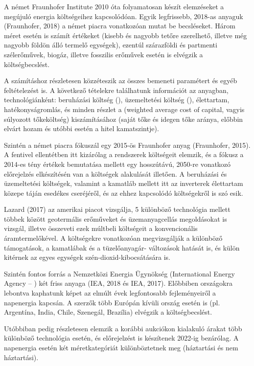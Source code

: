 \documentclass[twoside, magyar, showtrims]{corvinusphd}
\theoremstyle{plain}
\theoremstyle{remark}
\theoremstyle{definition}
\begin{document}
A német Fraunhofer Institute 2010 óta folyamatosan
készít elemzéseket a megújuló energia költségeihez kapcsolódóan.
Egyik legfrissebb, 2018-as anyaguk (Fraunhofer, 2018)
a német piacra vonatkozóan mutat be becsléseket.
Három  méret esetén is számít 
értékeket (kisebb és nagyobb tetőre szerelhető,
illetve még nagyobb földön álló termelő egységek), 
ezentúl szárazföldi és partmenti szélerőművek, biogáz,
illetve fosszilis erőművek esetén is elvégzik a költségbecslést.

A számításhoz részletesen közzéteszik
az összes bemeneti paramétert és egyéb feltételezést is.
A következő tételekre találhatunk információt
az anyagban, technológiánként: beruházási költség
(), üzemeltetési költség (), 
élettartam, hatékonyságromlás, és minden részlet a 
(weighted average cost of capital, vagyis súlyozott tőkeköltség)
kiszámításához (saját tőke és idegen tőke aránya, 
előbbin elvárt hozam és utóbbi esetén a hitel kamatszintje). 

Szintén a német piacra fókuszál egy 2015-ös
Fraunhofer anyag (Fraunhofer, 2015).
A fentivel ellentétben itt kizárólag a  
rendszerek költségeit elemzik, és a fókusz a 2014-es 
tény értékek bemutatása mellett egy hosszútávú,
2050-re vonatkozó előrejelzés elkészítésén 
van a költségek alakulását illetően.
A beruházási és üzemeltetési költségek,
valamint a kamatláb mellett itt az inverterek
élettartam közepe táján esedékes cseréjéről,
és az ehhez kapcsolódó költségekről is szó esik. 

Lazard (2017) az amerikai piacot vizsgálja,
5 különböző  technológia mellett többek
között geotermális erőműveket és üzemanyagcellás megoldásokat is vizsgál,
illetve összeveti ezek múltbeli költségeit a konvencionális áramtermelőkével.
A költségekre vonatkozóan megvizsgálják a különböző támogatások,
a kamatlábak és a tüzelőanyagár-
változások hatását is,
és külön kitérnek az egyes egységek szén-dioxid-kibocsátására is.

Szintén fontos forrás a Nemzetközi Energia
Ügynökség (International Energy Agency -- )
két friss anyaga (IEA, 2018 és IEA, 2017).
Előbbiben országokra lebontva kaphatunk képet
az elmúlt évek legfontosabb fejleményeiről a napenergia kapcsán.
A szerzők több Európán kívüli ország esetén is
(pl. Argentína, India, Chile, Szenegál, Brazília) elvégzik a költségbecslést.

Utóbbiban pedig részletesen elemzik a korábbi
aukciókon kialakuló árakat több különböző technológia esetén,
és előrejelzést is készítenek 2022-ig bezárólag.
A napenergia esetén két méretkategóriát 
különböztetnek meg (háztartási és nem háztartási). 
\end{document}
